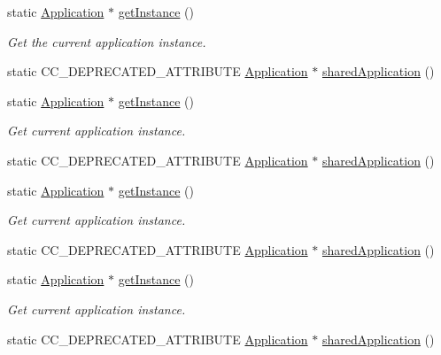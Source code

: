 \begin{DoxyCompactItemize}
static \hyperlink{classApplication}{Application} $\ast$ \hyperlink{classApplication_ab5dba709d2e806d5d83c297bab6cdace}{get\+Instance} ()
\begin{DoxyCompactList}\small\item\em Get the current application instance. \end{DoxyCompactList}\item 
static C\+C\+\_\+\+D\+E\+P\+R\+E\+C\+A\+T\+E\+D\+\_\+\+A\+T\+T\+R\+I\+B\+U\+TE \hyperlink{classApplication}{Application} $\ast$ \hyperlink{classApplication_a13774a693274456e734b221cea01628c}{shared\+Application} ()
\item 
static \hyperlink{classApplication}{Application} $\ast$ \hyperlink{classApplication_ab5dba709d2e806d5d83c297bab6cdace}{get\+Instance} ()
\begin{DoxyCompactList}\small\item\em Get current application instance. \end{DoxyCompactList}\item 
static C\+C\+\_\+\+D\+E\+P\+R\+E\+C\+A\+T\+E\+D\+\_\+\+A\+T\+T\+R\+I\+B\+U\+TE \hyperlink{classApplication}{Application} $\ast$ \hyperlink{classApplication_a13774a693274456e734b221cea01628c}{shared\+Application} ()
\item 
static \hyperlink{classApplication}{Application} $\ast$ \hyperlink{classApplication_ab5dba709d2e806d5d83c297bab6cdace}{get\+Instance} ()
\begin{DoxyCompactList}\small\item\em Get current application instance. \end{DoxyCompactList}\item 
static C\+C\+\_\+\+D\+E\+P\+R\+E\+C\+A\+T\+E\+D\+\_\+\+A\+T\+T\+R\+I\+B\+U\+TE \hyperlink{classApplication}{Application} $\ast$ \hyperlink{classApplication_a13774a693274456e734b221cea01628c}{shared\+Application} ()
\item 
static \hyperlink{classApplication}{Application} $\ast$ \hyperlink{classApplication_a723b8bba6edce3769a8d771770ca10e1}{get\+Instance} ()
\begin{DoxyCompactList}\small\item\em Get current application instance. \end{DoxyCompactList}\item 
static C\+C\+\_\+\+D\+E\+P\+R\+E\+C\+A\+T\+E\+D\+\_\+\+A\+T\+T\+R\+I\+B\+U\+TE \hyperlink{classApplication}{Application} $\ast$ \hyperlink{classApplication_a13774a693274456e734b221cea01628c}{shared\+Application} ()
\end{DoxyCompactItemize}
